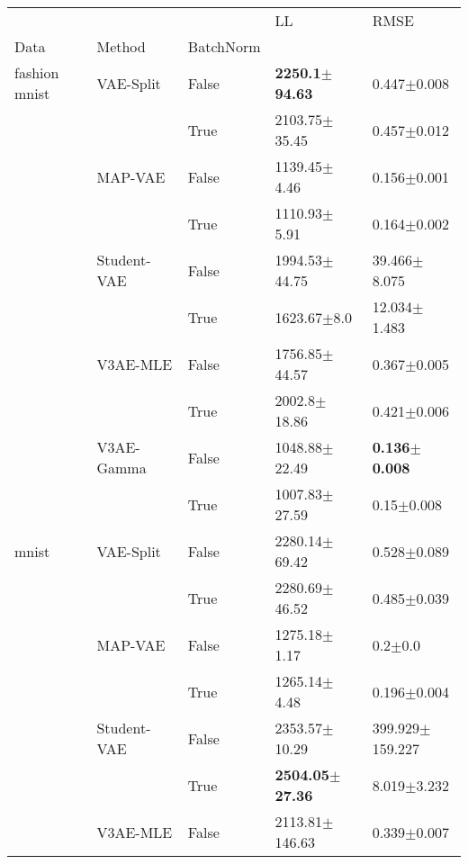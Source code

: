 \begin{tabular}{lllll}
\toprule
             &            &       &                          LL &                      RMSE \\
Data & Method & BatchNorm &                             &                           \\
\midrule
fashion mnist & VAE-Split & False &   \textbf{2250.1$\pm$94.63} &           0.447$\pm$0.008 \\
             &            & True  &           2103.75$\pm$35.45 &           0.457$\pm$0.012 \\
             & MAP-VAE & False &            1139.45$\pm$4.46 &           0.156$\pm$0.001 \\
             &            & True  &            1110.93$\pm$5.91 &           0.164$\pm$0.002 \\
             & Student-VAE & False &           1994.53$\pm$44.75 &          39.466$\pm$8.075 \\
             &            & True  &             1623.67$\pm$8.0 &          12.034$\pm$1.483 \\
             & V3AE-MLE & False &           1756.85$\pm$44.57 &           0.367$\pm$0.005 \\
             &            & True  &            2002.8$\pm$18.86 &           0.421$\pm$0.006 \\
             & V3AE-Gamma & False &           1048.88$\pm$22.49 &  \textbf{0.136$\pm$0.008} \\
             &            & True  &           1007.83$\pm$27.59 &            0.15$\pm$0.008 \\
mnist & VAE-Split & False &           2280.14$\pm$69.42 &           0.528$\pm$0.089 \\
             &            & True  &           2280.69$\pm$46.52 &           0.485$\pm$0.039 \\
             & MAP-VAE & False &            1275.18$\pm$1.17 &               0.2$\pm$0.0 \\
             &            & True  &            1265.14$\pm$4.48 &           0.196$\pm$0.004 \\
             & Student-VAE & False &           2353.57$\pm$10.29 &       399.929$\pm$159.227 \\
             &            & True  &  \textbf{2504.05$\pm$27.36} &           8.019$\pm$3.232 \\
             & V3AE-MLE & False &          2113.81$\pm$146.63 &           0.339$\pm$0.007 \\

\end{tabular}
